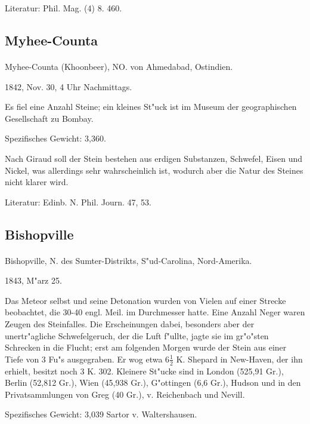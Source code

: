 \documentclass[a4paper, 11pt, oneside]{article}
\begin{document}
\footnotesize
Literatur: Phil. Mag. (4) 8. 460.

\subsection{Myhee-Counta}
\normalsize
\paragraph{}
Myhee-Counta (Khoonbeer), NO. von Ahmedabad, Ostindien.

1842, Nov. 30, 4 Uhr Nachmittags.

Es fiel eine Anzahl Steine; ein kleines St"uck ist im Museum der geographischen Gesellschaft zu Bombay.

Spezifisches Gewicht: 3,360.

Nach Giraud soll der Stein bestehen aus erdigen Substanzen, Schwefel, Eisen und Nickel, was allerdings sehr wahrscheinlich ist, wodurch aber die Natur des Steines nicht klarer wird.

\footnotesize
Literatur: Edinb. N. Phil. Journ. 47, 53.

\subsection{Bishopville}
\normalsize
\paragraph{}
Bishopville, N. des Sumter-Distrikts, S"ud-Carolina, Nord-Amerika.

1843, M"arz 25.

Das Meteor selbst und seine Detonation wurden von Vielen auf einer Strecke beobachtet, die 30-40 engl. Meil. im Durchmesser hatte. Eine Anzahl Neger waren Zeugen des Steinfalles. Die Erscheinungen dabei, besonders aber der unertr"agliche Schwefelgeruch, der die Luft f"ullte, jagte sie im gr"o"sten Schrecken in die Flucht; erst am folgenden Morgen wurde der Stein aus einer Tiefe von 3 Fu"s ausgegraben. Er wog etwa $6\frac{1}{2}$ K. Shepard in New-Haven, der ihn erhielt, besitzt noch 3 K. 302. Kleinere St"ucke sind in London (525,91 Gr.), Berlin (52,812 Gr.), Wien (45,938 Gr.), G"ottingen (6,6 Gr.), Hudson und in den Privatsammlungen von Greg (40 Gr.), v. Reichenbach und Nevill.

Spezifisches Gewicht: 3,039 Sartor v. Waltershausen.
\end{document}
